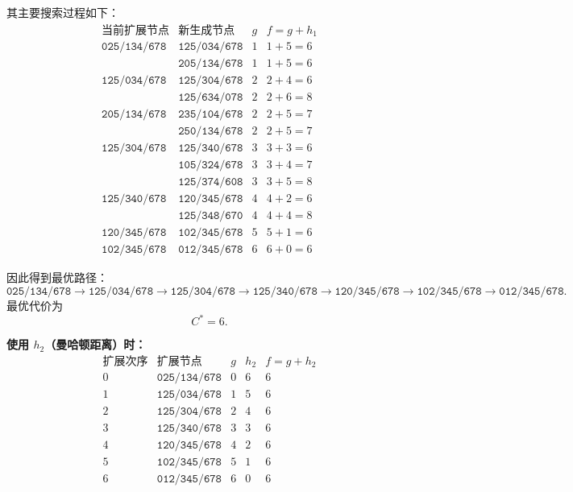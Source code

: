 ﻿\documentclass[../main.tex]{subfiles}
\begin{document}
\begin{enumerate}[itemsep=0.3em, topsep=0.2em, leftmargin=1.5em]
{    其主要搜索过程如下：
    \[
    \begin{array}{c|c|c|c}
    \text{当前扩展节点} & \text{新生成节点} & g & f=g+h_1\\
    \hline
    \texttt{025/134/678} & \texttt{125/034/678} & 1 & 1+5=6\\
                              & \texttt{205/134/678} & 1 & 1+5=6\\
    \hline
    \texttt{125/034/678} & \texttt{125/304/678} & 2 & 2+4=6\\
                              & \texttt{125/634/078} & 2 & 2+6=8\\
    \hline
    \texttt{205/134/678} & \texttt{235/104/678} & 2 & 2+5=7\\
                              & \texttt{250/134/678} & 2 & 2+5=7\\
    \hline
    \texttt{125/304/678} & \texttt{125/340/678} & 3 & 3+3=6\\
                              & \texttt{105/324/678} & 3 & 3+4=7\\
                              & \texttt{125/374/608} & 3 & 3+5=8\\
    \hline
    \texttt{125/340/678} & \texttt{120/345/678} & 4 & 4+2=6\\
                              & \texttt{125/348/670} & 4 & 4+4=8\\
    \hline
    \texttt{120/345/678} & \texttt{102/345/678} & 5 & 5+1=6\\
    \hline
    \texttt{102/345/678} & \texttt{012/345/678} & 6 & 6+0=6
    \end{array}
    \]

    因此得到最优路径：
    \[
    \texttt{025/134/678}
    \to
    \texttt{125/034/678}
    \to
    \texttt{125/304/678}
    \to
    \texttt{125/340/678}
    \to
    \texttt{120/345/678}
    \to
    \texttt{102/345/678}
    \to
    \texttt{012/345/678}.
    \]
    最优代价为
    \[
    C^*=6.
    \]

    \textbf{使用 $h_2$（曼哈顿距离）时：}
    \[
    \begin{array}{c|c|c|c|c}
    \text{扩展次序} & \text{扩展节点} & g & h_2 & f=g+h_2\\
    \hline
    0 & \texttt{025/134/678} & 0 & 6 & 6\\
    1 & \texttt{125/034/678} & 1 & 5 & 6\\
    2 & \texttt{125/304/678} & 2 & 4 & 6\\
    3 & \texttt{125/340/678} & 3 & 3 & 6\\
    4 & \texttt{120/345/678} & 4 & 2 & 6\\
    5 & \texttt{102/345/678} & 5 & 1 & 6\\
    6 & \texttt{012/345/678} & 6 & 0 & 6
    \end{array}
    \]

}
\end{enumerate}
\end{document}
